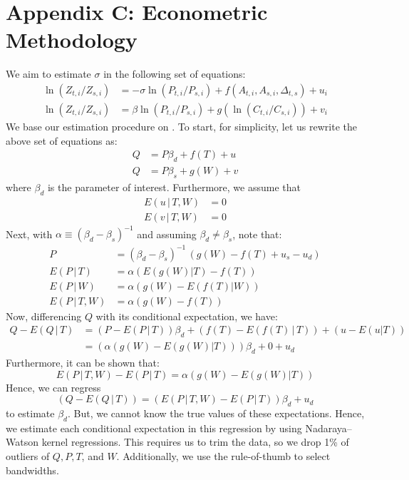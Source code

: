\documentclass[11pt,a4paper]{extarticle}
\begin{document}
\section{Appendix C: Econometric Methodology}
\label{sec:AppendixC}

We aim to estimate $\sigma$ in the following set of equations:
\begin{align*}
\ln (Z_{ t, i} / Z_{ s, i}) &= -\sigma \ln (P_{t,i} / P_{s,i}) +  f \left( A_{t,i}, A_{s,i}, \Delta_{t,s} \right) + u_i \\
\ln (Z_{ t, i} / Z_{ s, i}) &= \beta \ln (P_{t,i} / P_{s,i}) + g \left( \ln (C_{t,i} / C_{s,i})  \right) + v_{i}
\end{align*}
We base our estimation procedure on \citet{Newey}. To start, for simplicity, let us rewrite the above set of equations as:
\begin{align*}
Q &= P \beta_d + f(T) + u \\
Q &= P \beta_s + g(W) + v 
\end{align*}
where $\beta_d$ is the parameter of interest. Furthermore, we assume that 
\begin{align*}
E(u \, | \, T, W) &= 0 \\
E(v \, | \, T, W) &= 0 
\end{align*}
Next, with $\alpha \equiv (\beta_d - \beta_s)^{-1}$ and assuming $\beta_d \neq \beta_s$, note that:
\begin{align*}
P &= (\beta_d - \beta_s)^{-1} \, \left(  g(W) - f(T) + u_s - u_d \right)  \\
E(P\,|\,T)   &= \alpha \left( E(g(W)|T) - f(T)  \right)\\
E(P\,|\,W)   &= \alpha \left( g(W) - E(f(T)|W)  \right) \\
E(P\,|\,T,W) &= \alpha \left( g(W) - f(T)     \right) 
\end{align*}
Now, differencing $Q$ with its conditional expectation, we have:
\begin{align*}
Q - E(Q \,|\,T) &= (P - E(P\,|\,T))\beta_d + (f(T) - E(f(T) \,|\,T)) + (u - E(u|T))\\
&= (\alpha(g(W) - E(g(W)|T)))\beta_d + 0 + u_d 
\end{align*}
Furthermore, it can be shown that:
$$E(P\,|\,T,W) - E(P\,|\,T) = \alpha (g(W) - E(g(W)|T))$$
Hence, we can regress 
$$(Q - E(Q \,|\,T)) = (E(P\,|\,T,W) - E(P\,|\,T)) \beta_d + u_d $$
to estimate $\beta_d$. But, we cannot know the true values of these expectations. Hence, we estimate each conditional expectation in this regression by using Nadaraya–Watson kernel regressions. This requires us to trim the data, so we drop 1\% of outliers of $Q, P, T$, and $W$. Additionally, we use the \citet{Silverman} rule-of-thumb to select bandwidths. 
\end{document}
